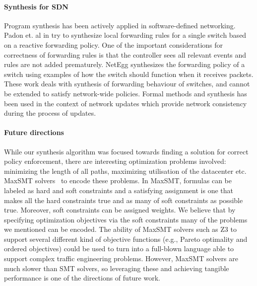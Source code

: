\paragraph{Synthesis for SDN}
Program synthesis has been actively applied in software-defined networking. Padon et. al in \cite{decentralize} try to synthesize local forwarding rules for a single switch based on a reactive forwarding policy. One of the important considerations for correctness of forwarding rules is that the controller sees 
all relevant events and rules are not added prematurely. NetEgg \cite{netegg} synthesizes the forwarding policy of a switch using examples of how the switch 
should function when it receives packets. These work deals with synthesis of forwarding behaviour of switches, and cannot be extended to satisfy network-wide policies.  Formal methods and synthesis has 
been used in the context of network updates \cite{updates, customconsistency} which provide network consistency during the process of updates. 


\paragraph{Future directions}
While our synthesis algorithm was focused towards finding a solution for correct policy enforcement,
 there are interesting optimization problems involved: minimizing the length of all paths, maximizing utilisation of the 
 datacenter etc. MaxSMT solvers~\cite{z3maxSMT} to encode these problems.
In MaxSMT, formulas can be labeled as hard and soft constraints and a satisfying assignment
is one that makes all the hard constraints true and as many of soft constraints as possible true.
Moreover, soft constraints can be assigned weights.
We believe that by specifying optimization objectives via the soft constraints many of the problems we mentioned can be encoded.
The ability of MaxSMT solvers such as Z3 to support several different kind of objective functions (e.g., Pareto optimality and ordered objectives)
could be used to turn \Name into a full-blown language able to support complex traffic engineering problems. 
However, MaxSMT solvers
 are much slower than SMT solvers, so leveraging these and achieving tangible performance is one of the directions of future work.
 
